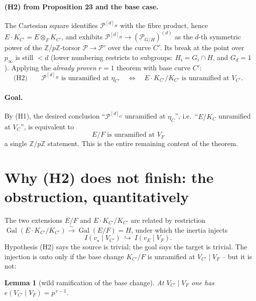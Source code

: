 \documentclass[11pt]{article}
\newcommand{\cP}{\mathcal{P}}
\newcommand{\Z}{\mathbb{Z}}
\DeclareMathOperator{\Gal}{Gal}
\theoremstyle{plain}
\newtheorem{lemma}[theorem]{Lemma}
\theoremstyle{definition}
\begin{document}
\paragraph{(H2) from Proposition 23 and the base case.}
The Cartesian square identifies $\cP^{[d]_H}$ with the fibre product, hence
$E\cdot K_{C'}=E\otimes_F K_{C'}$, and exhibits $\cP^{[d]_H}\to(\cP_{G/H})^{(d)}$ as the
$d$-th symmetric power of the $\Z/p\Z$-torsor $\cP\to\cP'$ over the curve $C'$. Its break
at the point over $p_\infty$ is still $<d$ (lower numbering restricts to subgroups:
$H_i=G_i\cap H$, and $G_d=1$). Applying the \emph{already proven} $r=1$ theorem with base
curve $C'$:
\[
\text{(H2)}\qquad \cP^{[d]_H} \text{ is unramified at } \eta_{C'}
\quad\Longleftrightarrow\quad E\cdot K_{C'}/K_{C'} \text{ is unramified at } V_{C'} .
\]

\paragraph{Goal.}
By (H1), the desired conclusion ``$\cP^{[d]_G}$ unramified at $\eta_C$'', i.e.\ ``$E/K_C$
unramified at $V_C$'', is equivalent to
\[
\boxed{\,E/F \text{ is unramified at } V_F\,}
\]
a single $\Z/p\Z$ statement. This is the entire remaining content of the theorem.

\section{Why (H2) does not finish: the obstruction, quantitatively}

The two extensions $E/F$ and $E\cdot K_{C'}/K_{C'}$ are related by restriction
$\Gal(E\cdot K_{C'}/K_{C'})\xrightarrow{\sim}\Gal(E/F)=H$, under which the inertia injects
\[
I(v_\star\mid V_{C'}) \ \hookrightarrow\ I(v_E\mid V_F).
\]
Hypothesis (H2) says the source is trivial; the goal says the target is trivial. The
injection is onto only if the base change $K_{C'}/F$ is unramified at $V_{C'}\mid V_F$ --
but it is not:

\begin{lemma}[wild ramification of the base change]\label{lem:wild-base}
At $V_{C'}\mid V_F$ one has $e(V_{C'}\mid V_F)=p^{\,r-1}$.
\end{lemma}
\end{document}

